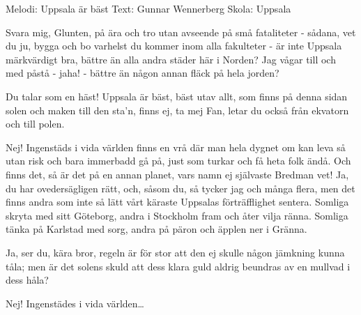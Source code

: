 \begin{song}
\begin{songmeta}
Melodi: Uppsala är bäst
Text: Gunnar Wennerberg
Skola: Uppsala
\end{songmeta}

\begin{songtext}
Svara mig, Glunten, på ära och tro
utan avseende på små fataliteter
- sådana, vet du ju, bygga och bo
varhelst du kommer inom alla fakulteter
- är inte Uppsala märkvärdigt bra,
bättre än alla andra städer här i Norden?
Jag vågar till och med påstå - jaha!
- bättre än någon annan fläck på hela jorden?

Du talar som en häst!
Uppsala är bäst,
bäst utav allt, som finns på denna sidan solen
och maken till den sta'n,
finns ej, ta mej Fan,
letar du också från ekvatorn och till polen.

Nej!
Ingenstäds i vida världen finns en vrå
där man hela dygnet om kan leva så
utan risk och bara immerbadd gå på,
just som turkar och få heta folk ändå.
Och finns det, så är det på en annan planet,
vars namn ej självaste Bredman vet!
\newpage
Ja, du har ovedersägligen rätt,
och, såsom du, så tycker jag och många flera,
men det finns andra som inte så lätt
vårt käraste Uppsalas förträfflighet sentera.
Somliga skryta med sitt Göteborg,
andra i Stockholm fram och åter vilja ränna.
Somliga tänka på Karlstad med sorg,
andra på päron och äpplen ner i Gränna.

Ja, ser du, kära bror,
regeln är för stor
att den ej skulle någon jämkning kunna tåla;
men är det solens skuld
att dess klara guld
aldrig beundras av en mullvad i dess håla?

Nej!
Ingenstädes i vida världen\ldots
    \end{songtext}
\end{song}
